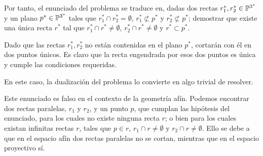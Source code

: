 \begin{exa}
\begin{enumerate}
		Por tanto, el enunciado del problema se traduce en, dadas dos rectas $r_1^*, r_2^*\in\mathbb{P}^{3^*}$ y un plano $p^*\in\mathbb{P}^{3^*}$ tales que $r_1^*\cap r_2^*=\emptyset$, $r_1^*\not\subset p^*$ y $r_2^*\not\subset p^*$; demostrar que existe una única recta $r^*$ tal que $r_1^*\cap r^*\not=\emptyset$, $r_2^*\cap r^*\not=\emptyset$ y $r^*\subset p^*$.
		
		Dado que las rectas $r_1^*, r_2^*$ no están contenidas en el plano $p^*$, cortarán con él en dos puntos únicos. Es claro que la recta engendrada por esos dos puntos es única y cumple las condiciones requeridas.
	\end{enumerate}
	En este caso, la dualización del problema lo convierte en algo trivial de resolver.
\end{exa}
\begin{obs}
	Este enunciado es falso en el contexto de la geometría afín. Podemos encontrar dos rectas paralelas, $r_1$ y $r_2$, y un punto $p$, que cumplan las hipótesis del enunciado, para los cuales no existe ninguna recta $r$; o bien para los cuales existan infinitas rectas $r$, tales que $p\in r$, $r_1\cap r\not=\emptyset$ y $r_2\cap r\not=\emptyset$. Ello se debe a que en el espacio afín dos rectas paralelas no se cortan, mientras que en el espacio proyectivo sí.
\end{obs}